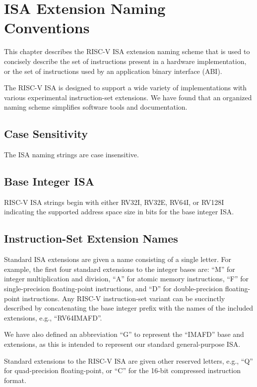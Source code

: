 \chapter{ISA Extension Naming Conventions}
\label{naming}

This chapter describes the RISC-V ISA extension naming scheme that is
used to concisely describe the set of instructions present in a
hardware implementation, or the set of instructions used by an
application binary interface (ABI).

\begin{commentary}
The RISC-V ISA is designed to support a wide variety of
implementations with various experimental instruction-set extensions.
We have found that an organized naming scheme simplifies software
tools and documentation.
\end{commentary}

\section{Case Sensitivity}

The ISA naming strings are case insensitive.

\section{Base Integer ISA}
RISC-V ISA strings begin with either RV32I, RV32E, RV64I, or RV128I
indicating the supported address space size in bits for the base
integer ISA.

\section{Instruction-Set Extension Names}

Standard ISA extensions are given a name consisting of a single
letter.  For example, the first four standard
extensions to the integer bases are:
``M'' for integer multiplication and division,
``A'' for atomic memory instructions,
``F'' for single-precision floating-point instructions, and
``D'' for double-precision floating-point instructions.
Any RISC-V instruction-set variant can be succinctly described by
concatenating the base integer prefix with the names of the included
extensions, e.g., ``RV64IMAFD''.

We have also defined an abbreviation ``G'' to represent the ``IMAFD''
base and extensions, as this is intended to represent our standard
general-purpose ISA.

Standard extensions to the RISC-V ISA are given other reserved
letters, e.g., ``Q'' for quad-precision floating-point, or
``C'' for the 16-bit compressed instruction format.

